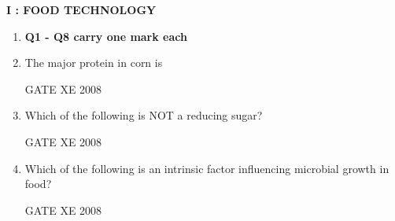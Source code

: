 \documentclass[12pt]{article}
\begin{document}
 \newpage

\begin{center}
    \textbf{\Large I : FOOD TECHNOLOGY}
\end{center}

\begin{enumerate}
\item[] \textbf{Q1 - Q8 carry one mark each}



    \item The major protein in corn is
\begin{enumerate}
\end{enumerate}
    
    GATE XE 2008

    \item Which of the following is NOT a reducing sugar? 
\begin{enumerate}
\end{enumerate}
    
    GATE XE 2008

    \item Which of the following is an intrinsic factor influencing microbial growth in food? 

\begin{enumerate}
\end{enumerate}
    
    GATE XE 2008


\end{enumerate}
\end{document}

